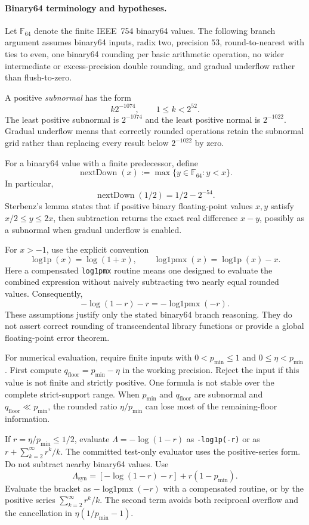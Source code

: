 \documentclass[11pt]{article}
\theoremstyle{definition}
\begin{document}
\paragraph{Binary64 terminology and hypotheses.}
Let $\mathbb F_{64}$ denote the finite IEEE~754 binary64 values.  The following branch argument
assumes binary64 inputs, radix two, precision $53$, round-to-nearest with ties to even, one
binary64 rounding per basic arithmetic operation, no wider intermediate or excess-precision
double rounding, and gradual underflow rather than flush-to-zero.

A positive \emph{subnormal} has the form
\[
  k2^{-1074},\qquad 1\le k<2^{52}.
\]
The least positive subnormal is $2^{-1074}$ and the least positive normal is $2^{-1022}$.
Gradual underflow means that correctly rounded operations retain the subnormal grid rather than
replacing every result below $2^{-1022}$ by zero.

For a binary64 value with a finite predecessor, define
\[
  \operatorname{nextDown}(x)
  :=\max\{y\in\mathbb F_{64}:y<x\}.
\]
In particular,
\[
  \operatorname{nextDown}(1/2)=1/2-2^{-54}.
\]
Sterbenz's lemma states that if positive binary floating-point values $x,y$ satisfy
$x/2\le y\le2x$, then subtraction returns the exact real difference $x-y$, possibly as a
subnormal when gradual underflow is enabled.

For $x>-1$, use the explicit convention
\[
  \operatorname{log1p}(x)=\log(1+x),
  \qquad
  \operatorname{log1pmx}(x)=\operatorname{log1p}(x)-x.
\]
Here a compensated \texttt{log1pmx} routine means one designed to evaluate the combined expression
without naively subtracting two nearly equal rounded values.  Consequently,
\[
  -\log(1-r)-r=-\operatorname{log1pmx}(-r).
\]
These assumptions justify only the stated binary64 branch reasoning.  They do not assert correct
rounding of transcendental library functions or provide a global floating-point error theorem.

For numerical evaluation, require finite inputs with $0<p_{\min}\le1$ and
$0\le\eta<p_{\min}$.  First compute
$q_{\mathrm{floor}}=p_{\min}-\eta$ in the working precision.  Reject the input if this value is
not finite and strictly positive.  One formula is not stable over the complete strict-support
range.  When $p_{\min}$ and $q_{\mathrm{floor}}$ are subnormal and
$q_{\mathrm{floor}}\ll p_{\min}$, the rounded ratio $\eta/p_{\min}$ can lose most of the
remaining-floor information.

If $r=\eta/p_{\min}\le1/2$, evaluate
$\Lambda=-\log(1-r)$ as \texttt{-log1p(-r)} or as
$r+\sum_{k=2}^{\infty}r^k/k$.  The committed test-only evaluator uses the positive-series form.
Do not subtract nearby binary64 values.
Use
\begin{equation}
  \Lambda_{\mathrm{syn}}
  =
  [-\log(1-r)-r]
  +
  r(1-p_{\min}).
\end{equation}
Evaluate the bracket as $-\operatorname{log1pmx}(-r)$ with a compensated routine, or by the
positive series $\sum_{k=2}^{\infty}r^k/k$.  The second term avoids both reciprocal overflow and the
cancellation in $\eta(1/p_{\min}-1)$.
\end{document}
